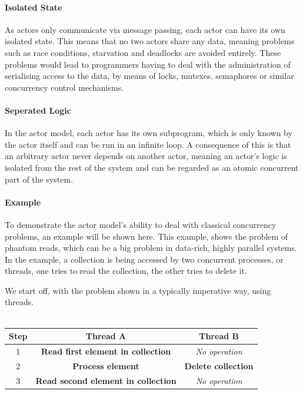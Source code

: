 \paragraph{Isolated State}
As actors only communicate via message passing, each actor can have its own isolated state. This means that no two actors share any data, meaning problems such as race conditions, starvation and deadlocks are avoided entirely. These problems would lead to programmers having to deal with the administration of serialising access to the data, by means of locks, mutexes, semaphores or similar concurrency control mechanisms.

\paragraph{Seperated Logic}
In the actor model, each actor has its own subprogram, which is only known by the actor itself and can be run in an infinite loop. A consequence of this is that an arbitrary actor never depends on another actor, meaning an actor's logic is isolated from the rest of the system and can be regarded as an atomic concurrent part of the system.

\paragraph{Example}
To demonstrate the actor model's ability to deal with classical concurrency problems, an example will be shown here. This example, shows the problem of phantom reads, which can be a big problem in data-rich, highly parallel systems. In the example, a collection is being accessed by two concurrent processes, or threads, one tries to read the collection, the other tries to delete it.

We start off, with the problem shown in a typically imperative way, using threads.\\\\
%
\begin{tabular}{ | c | c | c | }
\hline
Step & Thread A & Thread B \\\hline
1 & \textbf{Read first element in collection} & \textit{No operation} \\\hline
2 & \textbf{Process element} & \textbf{Delete collection}\\\hline
3 & \textbf{\color{red} Read second element in collection} & \textit{No operation}\\\hline
\end{tabular}\\

